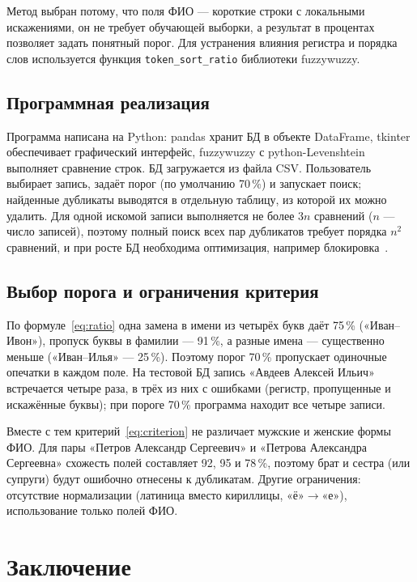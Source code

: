 \documentclass{misisarticle}
\begin{document}
Метод выбран потому, что поля ФИО --- короткие строки с локальными искажениями, он не требует обучающей выборки, а результат в процентах позволяет задать понятный порог. Для устранения влияния регистра и порядка слов используется функция \texttt{token\_sort\_ratio} библиотеки fuzzywuzzy.

\subsection{Программная реализация}

Программа написана на Python: pandas хранит БД в объекте DataFrame, tkinter обеспечивает графический интерфейс, fuzzywuzzy с python-Levenshtein выполняет сравнение строк. БД загружается из файла CSV. Пользователь выбирает запись, задаёт порог (по умолчанию 70\,\%) и запускает поиск; найденные дубликаты выводятся в отдельную таблицу, из которой их можно удалить. Для одной искомой записи выполняется не более $3n$ сравнений ($n$ --- число записей), поэтому полный поиск всех пар дубликатов требует порядка $n^2$ сравнений, и при росте БД необходима оптимизация, например блокировка~\cite{christen2012}.

\subsection{Выбор порога и ограничения критерия}

По формуле~\eqref{eq:ratio} одна замена в имени из четырёх букв даёт 75\,\% («Иван--Ивон»), пропуск буквы в фамилии --- 91\,\%, а разные имена --- существенно меньше («Иван--Илья» --- 25\,\%). Поэтому порог 70\,\% пропускает одиночные опечатки в каждом поле. На тестовой БД запись «Авдеев Алексей Ильич» встречается четыре раза, в трёх из них с ошибками (регистр, пропущенные и искажённые буквы); при пороге 70\,\% программа находит все четыре записи.

Вместе с тем критерий~\eqref{eq:criterion} не различает мужские и женские формы ФИО. Для пары «Петров Александр Сергеевич» и «Петрова Александра Сергеевна» схожесть полей составляет 92, 95 и 78\,\%, поэтому брат и сестра (или супруги) будут ошибочно отнесены к дубликатам. Другие ограничения: отсутствие нормализации (латиница вместо кириллицы, «ё»$\to$«е»), использование только полей ФИО.

\section{Заключение}
\end{document}

